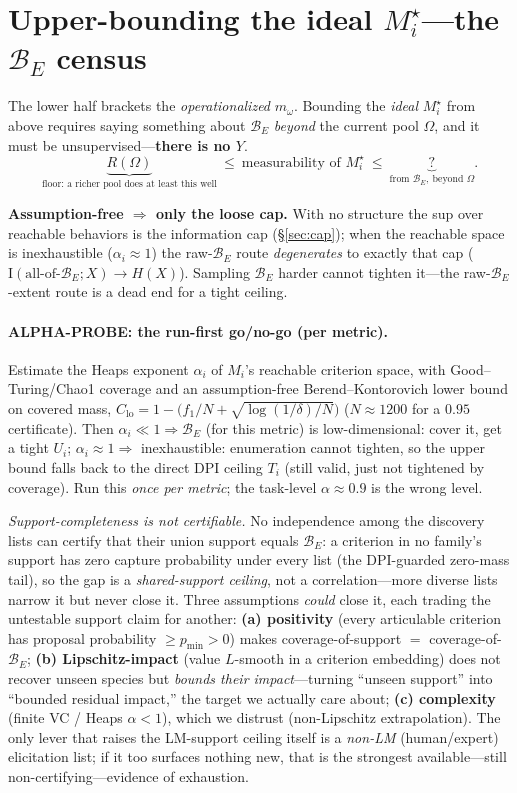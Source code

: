 \documentclass[11pt]{article}
\newcommand{\Iv}{\mathrm{I}}
\newcommand{\Bset}{\mathcal{B}_E}
\newcommand{\Om}{\Omega}
\newcommand{\Mw}{m_\omega}
\newcommand{\Mstar}{M_i^\star}
\begin{document}
\section{Upper-bounding the ideal $\Mstar$---the $\Bset$ census}\label{sec:upperbound}
The lower half brackets the \emph{operationalized} $\Mw$. Bounding the \emph{ideal} $\Mstar$ from above
requires saying something about $\Bset$ \emph{beyond} the current pool $\Om$, and it must be
unsupervised---\textbf{there is no $Y$}.
\[
\underbrace{R(\Om)}_{\text{floor: a richer pool does at least this well}}
\ \le\ \text{measurability of }\Mstar\ \le\
\underbrace{?}_{\text{from }\Bset,\ \text{beyond }\Om}.
\]

\textbf{Assumption-free $\Rightarrow$ only the loose cap.} With no structure the sup over reachable
behaviors is the information cap (\S\ref{sec:cap}); when the reachable space is inexhaustible
($\alpha_i\approx1$) the raw-$\Bset$ route \emph{degenerates} to exactly that cap
($\Iv(\text{all-of-}\Bset;X)\to H(X)$). Sampling $\Bset$ harder cannot tighten it---the raw-$\Bset$-extent
route is a dead end for a tight ceiling.

\paragraph{ALPHA-PROBE: the run-first go/no-go (per metric).} Estimate the Heaps exponent $\alpha_i$ of
$M_i$'s reachable criterion space, with Good--Turing/Chao1 coverage and an assumption-free
Berend--Kontorovich lower bound on covered mass,
$C_{\mathrm{lo}}=1-\big(f_1/N+\sqrt{\log(1/\delta)/N}\big)$ ($N\!\approx\!1200$ for a $0.95$ certificate).
Then $\alpha_i\ll1\Rightarrow\Bset$ (for this metric) is low-dimensional: cover it, get a tight $U_i$;
$\alpha_i\approx1\Rightarrow$ inexhaustible: enumeration cannot tighten, so the upper bound falls back to
the direct DPI ceiling $T_i$ (still valid, just not tightened by coverage). Run this \emph{once per metric};
the task-level $\alpha\approx0.9$ is the wrong level.

\emph{Support-completeness is not certifiable.} No independence among the discovery lists can certify that
their union support equals $\Bset$: a criterion in no family's support has zero capture probability under every
list (the DPI-guarded zero-mass tail), so the gap is a \emph{shared-support ceiling}, not a correlation---more
diverse lists narrow it but never close it. Three assumptions \emph{could} close it, each trading the
untestable support claim for another: \textbf{(a) positivity} (every articulable criterion has proposal
probability $\ge p_{\min}>0$) makes coverage-of-support $=$ coverage-of-$\Bset$; \textbf{(b) Lipschitz-impact}
(value $L$-smooth in a criterion embedding) does not recover unseen species but \emph{bounds their
impact}---turning ``unseen support'' into ``bounded residual impact,'' the target we actually care about;
\textbf{(c) complexity} (finite VC / Heaps $\alpha<1$), which we distrust (non-Lipschitz extrapolation). The
only lever that raises the LM-support ceiling itself is a \emph{non-LM} (human/expert) elicitation list; if it
too surfaces nothing new, that is the strongest available---still non-certifying---evidence of exhaustion.
\end{document}
